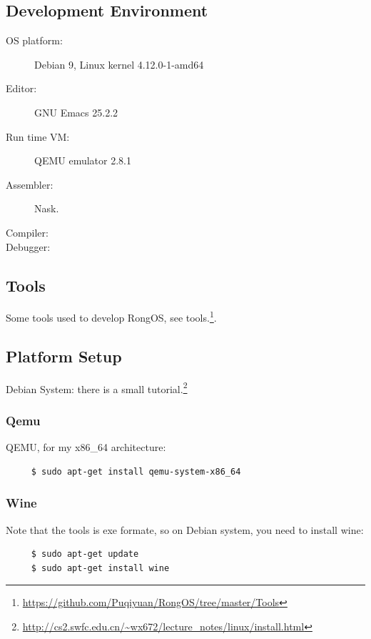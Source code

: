 \documentclass{swfcthesis}
\begin{document}
\subsection{Development Environment}
\label{sec:devel-envir}

\begin{description}
\item[OS platform:] Debian 9, Linux kernel 4.12.0-1-amd64
\item[Editor:] GNU Emacs 25.2.2
\item[Run time VM:] QEMU emulator 2.8.1
\item[Assembler:]Nask.
\item[Compiler:] 
\item[Debugger:] 
\end{description}

\subsection{Tools}
\label{sec:tools}

Some tools used to develop RongOS, see
tools.\footnote{\url{https://github.com/Puqiyuan/RongOS/tree/master/Tools}}.

\subsection{Platform Setup}
\label{sec:install}

Debian System: there is a small
tutorial.\footnote{\url{http://cs2.swfc.edu.cn/~wx672/lecture_notes/linux/install.html}}

\subsubsection{Qemu}
\label{sec:qemu}


QEMU, for my x86\_64 architecture: 
\begin{verbatim}
     $ sudo apt-get install qemu-system-x86_64
\end{verbatim}

\subsubsection{Wine}
\label{sec:wine}


Note that the tools is exe formate, so on Debian system, you need to install wine:
\begin{verbatim}
     $ sudo apt-get update
     $ sudo apt-get install wine
\end{verbatim}
\end{document}
